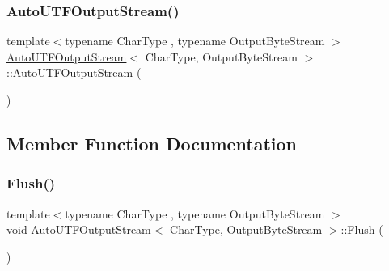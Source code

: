\subsubsection{\texorpdfstring{Auto\+U\+T\+F\+Output\+Stream()}{AutoUTFOutputStream()}\hspace{0.1cm}{\footnotesize\ttfamily [2/2]}}
{\footnotesize\ttfamily template$<$typename Char\+Type , typename Output\+Byte\+Stream $>$ \\
\hyperlink{classAutoUTFOutputStream}{Auto\+U\+T\+F\+Output\+Stream}$<$ Char\+Type, Output\+Byte\+Stream $>$\+::\hyperlink{classAutoUTFOutputStream}{Auto\+U\+T\+F\+Output\+Stream} (\begin{DoxyParamCaption}\item[{const \hyperlink{classAutoUTFOutputStream}{Auto\+U\+T\+F\+Output\+Stream}$<$ Char\+Type, Output\+Byte\+Stream $>$ \&}]{ }\end{DoxyParamCaption})\hspace{0.3cm}{\ttfamily [private]}}



\subsection{Member Function Documentation}
\mbox{\label{classAutoUTFOutputStream_a38b54c84ba0c479552256ac092529f47}} 
\subsubsection{\texorpdfstring{Flush()}{Flush()}}
{\footnotesize\ttfamily template$<$typename Char\+Type , typename Output\+Byte\+Stream $>$ \\
\hyperlink{imgui__impl__opengl3__loader_8h_ac668e7cffd9e2e9cfee428b9b2f34fa7}{void} \hyperlink{classAutoUTFOutputStream}{Auto\+U\+T\+F\+Output\+Stream}$<$ Char\+Type, Output\+Byte\+Stream $>$\+::Flush (\begin{DoxyParamCaption}{ }\end{DoxyParamCaption})\hspace{0.3cm}{\ttfamily [inline]}}

\mbox{\label{classAutoUTFOutputStream_a62091565a8103d69002be2e2f4f0ba2c}} 
